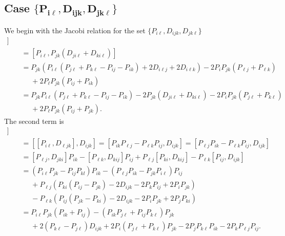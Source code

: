 \documentclass[10pt,a4paper]{amsart}
\numberwithin{equation}{section}
\begin{document}
\subsection[Case \{ P\_il, D\_ ijk, D\_ jkl\}]{Case $\boldsymbol{\{ P_{i \ell}, D_{ ijk}, D_{ jk\ell}\} }$}
We begin with the Jacobi relation for the set $\{ P_{i \ell}, D_{ ijk}, D_{ jk\ell}\}$
\begin{gather}
 [ P_{i \ell}, [ D_{ ijk}, D_{jkl}]]  \nonumber\\
 \qquad=  [P_{i\ell}, P_{jk}(D_{ji\ell} +D_{ki\ell}) ] \nonumber\\
 \qquad=  P_{jk}  ( P_{i\ell}( P_{j \ell}+ P_{k \ell} -P_{ij} -P_{ik}) +2D_{i \ell j} +2D_{ i\ell k}  )
   - 2P_i P_{jk}(P_{\ell j}+P_{\ell k}) \nonumber \\
   \phantom{\qquad  =}{}+ 2P_{\ell}P_{jk}(P_{ij} +P_{ik})\nonumber \\
\qquad=  P_{jk} P_{i\ell}(P_{j \ell}+P_{k\ell}-P_{ij} -P_{ik} )
  -2P_{jk}(D_{j i \ell} + D_{k i \ell})- 2 P_iP_{jk}  (P_{j \ell} +P_{k \ell} ) \nonumber \\
 \phantom{\qquad  =}{} +2P_{\ell}P_{jk}  (P_{ij} +P_{jk} ).\label{Acom}
 \end{gather}
The second term is
\begin{gather}
   [ D_{ ijk}, [D_{jk\ell}, P_{i \ell}]]\nonumber\\
   \qquad=  [[  P_{i\ell},D_{\ell jk}], D_{ijk}]  = [P_{ik} P_{\ell j} -P_{\ell k} P_{ij}, D_{ijk}]
   =  [ P_{\ell j}P_{ik} -P_{\ell k} P_{ij}, D_{ijk}]\nonumber\\
   \qquad=  [ P_{\ell j}, D_{jki}]P_{ik} - [P_{\ell k}, D_{kij}]P_{ij} + P_{\ell j} [P_{ki}, D_{kij} ]-P_{\ell k}[P_{ij}, D_{ijk}]\nonumber \\
 \qquad  =  (P_{i \ell}P_{jk}-P_{ij}P_{kl})P_{ik} - (P_{\ell j} P_{ik}- P_{jk}P_{i \ell}) P_{ij} \nonumber \\
   \phantom{\qquad  =}{} + P_{\ell j} ( P_{ki}( P_{ij}-P_{jk}) - 2D_{ijk} -2P_k P_{ij}+2P_iP_{jk} )\nonumber \\
      \phantom{\qquad  =}{}  - P_{\ell k} ( P_{ij}( P_{jk}-P_{ki}) - 2D_{ijk} -2P_i P_{jk}+2P_jP_{ki} )\nonumber \\
 \qquad =  P_{i \ell}P_{jk}(P_{ik}+P_{ij}) - (P_{ik} P_{j\ell}+P_{ij}P_{k \ell}) P_{jk} \nonumber\\
     \phantom{\qquad  =}{}   +2(P_{k \ell}-P_{j \ell})D_{ijk}+ 2P_i(P_{j\ell}+P_{k\ell}) P_{jk} - 2P_{j}P_{k\ell}P_{ik}-2P_k P_{\ell j} P_{ij}.\label{Bcom}
   \end{gather}
\end{document}
